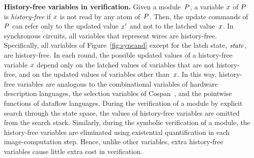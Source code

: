 \mypar
{\bf History-free variables in verification.}
Given a module~${P}$, a variable $x$ of ${P}$ is {\em history-free\/} if
$x$ is not read by any atom of~${P}$.
Then, the update commands of ${P}$ can refer only to the updated value
$x'$ and not to the latched value~$x$.
In synchronous circuits, all variables that represent wires are history-free.
Specifically, all variables of Figure~\ref{fig:syncand} except for the latch
state, ${\it state\/}$, are history-free.
In each round, the possible updated values of a history-free variable $x$
depend only on the latched values of variables that are not history-free, and
on the updated values of variables other than~$x$.
In this way, history-free variables are analogous to the combinational
variables of hardware description languages, the selection variables of
{\sc Cospan}~\cite{Kurshan94}, and the pointwise functions of dataflow
languages.
During the verification of a module by explicit search through the state
space, the values of history-free variables are omitted from the search
stack.
Similarly, during the symbolic verification of a module, the history-free
variables are eliminated using existential quantification in each
image-computation step.
Hence, unlike other variables, extra history-free variables cause little
extra cost in verification.


